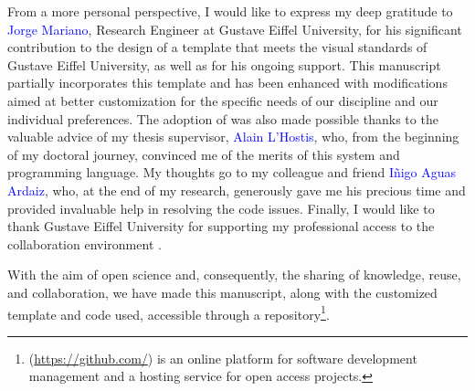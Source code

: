 From a more personal perspective, I would like to express my deep gratitude to \textcolor{blue}{Jorge Mariano}, Research Engineer at Gustave Eiffel University, for his significant contribution to the design of a \latexword{\LaTeX} template that meets the visual standards of Gustave Eiffel University, as well as for his ongoing support. This manuscript partially incorporates this template and has been enhanced with modifications aimed at better customization for the specific needs of our discipline and our individual preferences. The adoption of \latexword{\LaTeX} was also made possible thanks to the valuable advice of my thesis supervisor, \textcolor{blue}{Alain L'Hostis}, who, from the beginning of my doctoral journey, convinced me of the merits of this system and programming language. My thoughts go to my colleague and friend \textcolor{blue}{Iñigo Aguas Ardaiz}, who, at the end of my research, generously gave me his precious time and provided invaluable help in resolving the code issues. Finally, I would like to thank Gustave Eiffel University for supporting my professional access to the \latexword{\LaTeX} collaboration environment .%

With the aim of open science and, consequently, the sharing of knowledge, reuse, and collaboration, we have made this manuscript, along with the customized template and code used, accessible through a  repository\footnote{
     (\url{https://github.com/}) is an online platform for software development management and a hosting service for open access projects.
}.%

    \bigskip
    \begin{tcolorbox}[colback=white!5!white,
                      colframe=blue!75!blue,
                      title=
                      \bigskip
                      \center{\Marque{GitHub} Repository}
                      \bigskip]
    \end{tcolorbox}